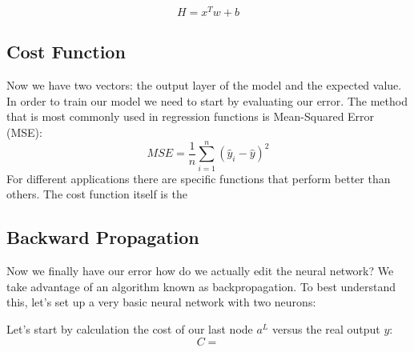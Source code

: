 \documentclass[12pt]{article}
\begin{document}
\vspace{-1ex}

\vspace{-1ex}
\vspace{-1ex}
\vspace{-1ex}
\vspace{-1ex}
$$
H = x^Tw + b
$$
\vspace{-3ex}
\vspace{-3ex}
\vspace{-3ex}
\vspace{-3ex}
\subsection*{Cost Function}
\vspace{-3ex}
Now we have two vectors: the output layer of the model and the expected value. In order to train our model we need to start by evaluating our error. The method that is most commonly used in regression functions is Mean-Squared Error (MSE):
$$
MSE=\frac{1}{n}\sum_{i=1}^{n}(\hat{y}_i-\hat{y})^2
$$
\vspace{-3ex}
For different applications there are specific functions that perform better than others. The cost function itself is the 

\subsection*{Backward Propagation}
Now we finally have our error how do we actually edit the neural network? We take advantage of an algorithm known as backpropagation. To best understand this, let's set up a very basic neural network with two neurons:

 \begin{center}
	
\end{center}
 
 Let's start by calculation the cost of our last node $a^L$ versus the real output $y$:
 $$
 C = 
 $$
 
\end{document}
